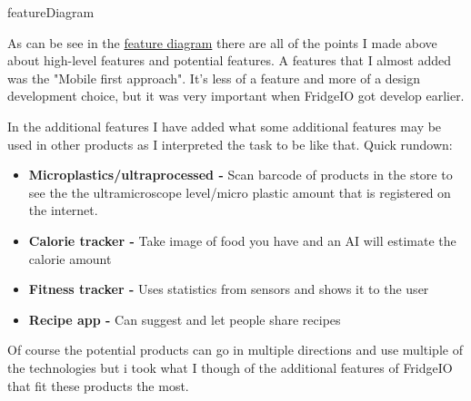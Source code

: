 {featureDiagram}

As can be see in the \hyperref[fig:FeatureDiagram]{feature diagram} there are all of the points I made above about high-level features and potential features. A features that I almost added was the "Mobile first approach". It's less of a feature and more of a design development choice, but it was very important when FridgeIO got develop earlier. 

In the additional features I have added what some additional features may be used in other products as I interpreted the task to be like that. Quick rundown:
\begin{itemize}
    \item \textbf{Microplastics/ultraprocessed -} Scan barcode of products in the store to see the the ultramicroscope level/micro plastic amount that is registered on the internet.
    \item \textbf{Calorie tracker -} Take image of food you have and an AI will estimate the calorie amount
    \item \textbf{Fitness tracker -} Uses statistics from sensors and shows it to the user
    \item \textbf{Recipe app -} Can suggest and let people share recipes
\end{itemize}
Of course the potential products can go in multiple directions and use multiple of the technologies but i took what I though of the additional features of FridgeIO that fit these products the most. 